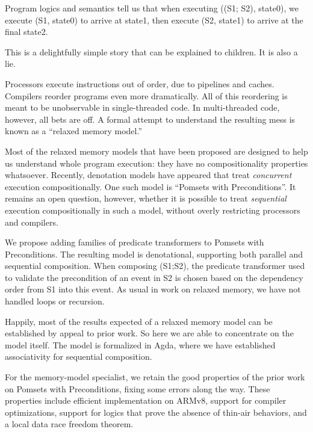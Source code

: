 Program logics and semantics tell us that when executing ((S1; S2), state0),
we execute (S1, state0) to arrive at state1, then execute (S2, state1) to
arrive at the final state2.

This is a delightfully simple story that can be explained to children.  It is
also a lie.

Processors execute instructions out of order, due to pipelines and caches.
Compilers reorder programs even more dramatically.  All of this reordering is
meant to be unobservable in single-threaded code.  In multi-threaded code,
however, all bets are off.  A formal attempt to understand the resulting mess
is known as a ``relaxed memory model.''

Most of the relaxed memory models that have been proposed are designed to
help us understand whole program execution: they have no compositionality
properties whatsoever.  Recently, denotation models have appeared that treat
\emph{concurrent} execution compositionally.  One such model is ``Pomsets with
Preconditions''.  It remains an open question, however, whether it is
possible to treat \emph{sequential} execution compositionally in such a model,
without overly restricting processors and compilers.

We propose adding families of predicate transformers to Pomsets with
Preconditions.  The resulting model is denotational, supporting both parallel
and sequential composition.  When composing (S1;S2), the predicate
transformer used to validate the precondition of an event in S2 is chosen
based on the dependency order from S1 into this event.  As usual in work on
relaxed memory, we have not handled loops or recursion.

Happily, most of the results expected of a relaxed memory model can be
established by appeal to prior work.  So here we are able to concentrate on
the model itself.  The model is formalized in Agda, where we have established
associativity for sequential composition.

For the memory-model specialist, we retain the good properties of the prior
work on Pomsets with Preconditions, fixing some errors along the way.  These
properties include efficient implementation on ARMv8, support for compiler
optimizations, support for logics that prove the absence of thin-air
behaviors, and a local data race freedom theorem.
